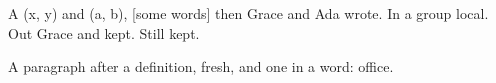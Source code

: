 \documentclass{article}
\def\pair#1#2{(#1, #2)}
\def\upto#1.{[#1]}
\newcommand{\name}{Ada}
\let\oldname\name
\renewcommand{\name}{Grace}
\edef\both{\name{} and \oldname}
\begin{document}
A \pair{x}{y} and \pair ab, \upto some words. then \both{} wrote.
{\gdef\later{kept}\renewcommand{\name}{local} In a group \name.} Out \name{} and \later.
\providecommand{\later}{never} Still \later.

\def\new{fresh} A paragraph after a definition, \new, and one in a word: of\def\x{y}fice.
\end{document}
